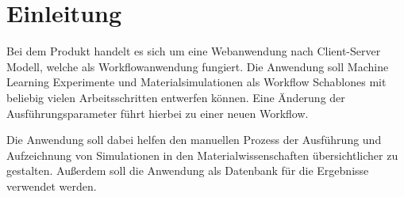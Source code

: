 \chapter{Einleitung}
Bei dem Produkt handelt es sich um eine Webanwendung nach  \gls{Client-Server} Modell, welche als Workflowanwendung fungiert. Die Anwendung soll \gls{Machine Learning} Experimente und Materialsimulationen als \glspl{Workflow Schablone} mit beliebig vielen Arbeitsschritten entwerfen können. Eine Änderung der Ausführungsparameter führt hierbei zu einer neuen \gls{Workflow}.

Die Anwendung soll dabei helfen den manuellen Prozess der Ausführung und Aufzeichnung von Simulationen in den Materialwissenschaften übersichtlicher zu gestalten. Außerdem soll die Anwendung als Datenbank für die Ergebnisse verwendet werden.
